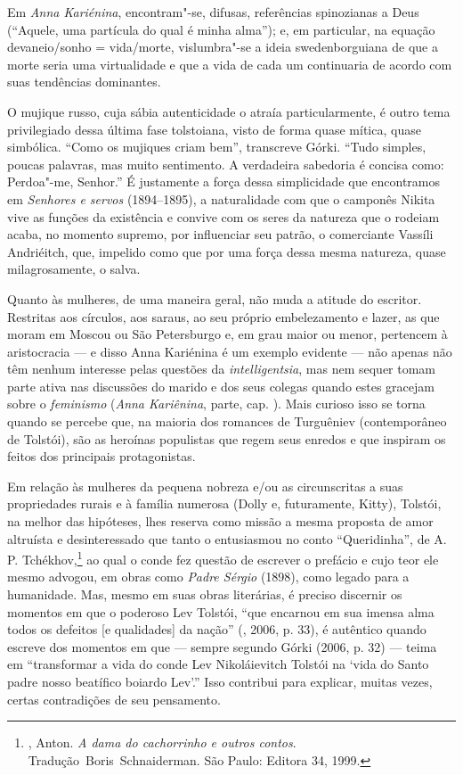 Em \emph{Anna Kariénina}, encontram"-se, difusas, referências
spinozianas a Deus (``Aquele, uma partícula do qual é minha
alma''); e, em particular, na equação
devaneio/sonho = vida/morte, vislumbra"-se a ideia swedenborguiana
de que a morte seria uma virtualidade e que a vida de cada um
continuaria de acordo com suas tendências dominantes.

O mujique russo, cuja sábia autenticidade o atraía particularmente,
é outro tema privilegiado dessa última fase tolstoiana, visto de
forma quase mítica, quase simbólica. ``Como os mujiques criam bem'',
transcreve Górki. ``Tudo simples, poucas palavras, mas muito
sentimento. A verdadeira sabedoria é concisa como: Perdoa"-me, Senhor.''
É justamente a força dessa simplicidade que encontramos
em \emph{Senhores e servos} (1894--1895), a naturalidade com que o
camponês Nikita vive as funções da existência e convive com os seres da
natureza que o rodeiam acaba, no momento supremo, por influenciar seu
patrão, o comerciante Vassíli Andriéitch, que, impelido como que por uma
força dessa mesma natureza, quase milagrosamente, o salva.

Quanto às mulheres, de uma maneira geral, não muda a atitude do
escritor. Restritas aos círculos, aos saraus, ao seu próprio
embelezamento e lazer, as que moram em Moscou ou São Petersburgo e,
em grau maior ou menor, pertencem à aristocracia --- e disso Anna
Kariénina é um exemplo evidente --- não apenas não têm nenhum
interesse pelas questões da \emph{intelligentsia}, mas nem sequer
tomam parte ativa nas discussões do marido e dos seus colegas
quando estes gracejam sobre o \emph{feminismo} (\emph{Anna
Kariênina},  parte, cap. ). Mais curioso
isso se torna quando se percebe que, na maioria dos romances de
Turguêniev (contemporâneo de Tolstói), são as heroínas populistas
que regem seus enredos e que inspiram os feitos dos principais
protagonistas.

Em relação às mulheres da pequena nobreza e/ou as circunscritas a
suas propriedades rurais e à família numerosa (Dolly e,
futuramente, Kitty), Tolstói, na melhor das hipóteses, lhes
reserva como missão a mesma proposta de amor altruísta e
desinteressado que tanto o entusiasmou no conto ``Queridinha'',
de A. P. Tchékhov,\footnote{, Anton. \emph{A dama
do cachorrinho e outros contos}. Tradução~Boris~Schnaiderman. São
Paulo: Editora 34, 1999.} ao qual o conde fez questão de escrever
o prefácio e cujo teor ele mesmo advogou, em obras como
\emph{Padre Sérgio} (1898), como legado para a humanidade. Mas, mesmo
em suas obras literárias, é preciso discernir os momentos em que o
poderoso Lev Tolstói, ``que encarnou em sua imensa alma todos os
defeitos [e qualidades] da nação'' (, 2006, p. 33),
é autêntico quando escreve dos momentos em que --- sempre segundo
Górki (2006, p. 32) --- teima em ``transformar a vida do conde Lev
Nikoláievitch Tolstói na ‘vida do Santo padre nosso beatífico boiardo
Lev’.'' Isso contribui para explicar, muitas vezes, certas contradições
de seu pensamento.

